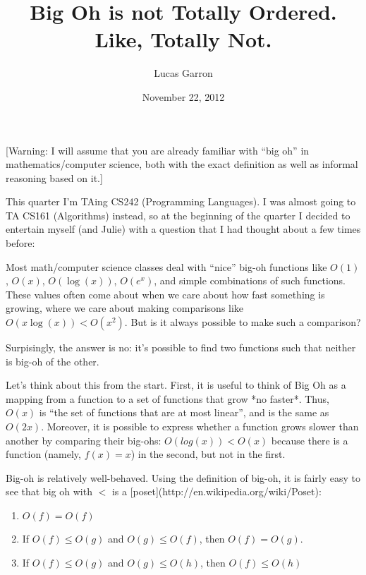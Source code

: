 \documentclass[11pt]{amsart}
\title{Big Oh is not Totally Ordered.\\Like, Totally Not.}
\author{Lucas Garron}
\date{November 22, 2012}                                           %
\begin{document}
\maketitle

[Warning: I will assume that you are already familiar with ``big oh'' in mathematics/computer science, both with the exact definition as well as informal reasoning based on it.]

This quarter I'm TAing CS242 (Programming Languages). I was almost going to TA CS161 (Algorithms) instead, so at the beginning of the quarter I decided to entertain myself (and Julie) with a question that I had thought about a few times before:

Most math/computer science classes deal with ``nice'' big-oh functions like $O(1)$, $O(x)$, $O(\log(x))$, $O(e^x)$, and simple combinations of such functions. These values often come about when we care about how fast something is growing, where we care about making comparisons like $O(x \log(x)) < O(x^2)$. But is it always possible to make such a comparison?

Surpisingly, the answer is no: it's possible to find two functions such that neither is big-oh of the other.

Let's think about this from the start. First, it is useful to think of Big Oh as a mapping from a function to a set of functions that grow *no faster*. Thus, $O(x)$ is ``the set of functions that are at most linear'', and is the same as $O(2x)$. Moreover, it is possible to express whether a function grows slower than another by comparing their big-ohs: $O(log(x)) < O(x)$ because there is a function (namely, $f(x) = x$) in the second, but not in the first.

Big-oh is relatively well-behaved. Using the definition of big-oh, it is fairly easy to see that big oh with $<$ is a [poset](http://en.wikipedia.org/wiki/Poset):

\begin{enumerate}
\item $O(f) = O(f)$
\item If $O(f) \leq O(g)$ and $O(g) \leq O(f)$, then $O(f) = O(g)$.
\item If $O(f) \leq O(g)$ and $O(g) \leq O(h)$, then $O(f) \leq O(h)$
\end{enumerate}
\end{document}
